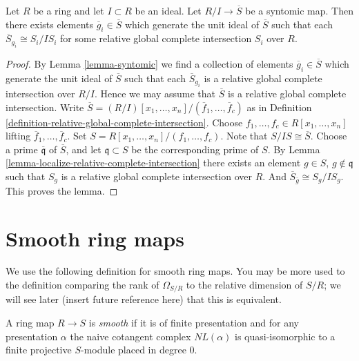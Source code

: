 \begin{lemma}
\label{lemma-lift-syntomic}
Let $R$ be a ring and let $I \subset R$ be an ideal.
Let $R/I \to \overline{S}$ be a syntomic map.
Then there exists elements $\overline{g}_i \in \overline{S}$
which generate the unit ideal of $\overline{S}$
such that each $\overline{S}_{g_i} \cong S_i/IS_i$
for some relative global complete intersection $S_i$
over $R$.
\end{lemma}

\begin{proof}
By Lemma \ref{lemma-syntomic} we find a collection of elements
$\overline{g}_i \in \overline{S}$
which generate the unit ideal of $\overline{S}$
such that each $\overline{S}_{g_i}$ is a relative
global complete intersection over $R/I$.
Hence we may assume that $\overline{S}$ is a
relative global complete intersection.
Write
$\overline{S} =
(R/I)[x_1, \ldots, x_n]/(\overline{f}_1, \ldots, \overline{f}_c)$
as in Definition \ref{definition-relative-global-complete-intersection}.
Choose $f_1, \ldots, f_c \in R[x_1, \ldots, x_n]$
lifting $\overline{f}_1, \ldots, \overline{f}_c$.
Set $S = R[x_1, \ldots, x_n]/(f_1, \ldots, f_c)$.
Note that $S/IS \cong \overline{S}$.
Choose a prime $\overline{\mathfrak q}$ of $\overline{S}$,
and let $\mathfrak q \subset S$ be the corresponding prime of $S$. 
By Lemma \ref{lemma-localize-relative-complete-intersection}
there exists an element $g \in S$, $g \not\in \mathfrak q$
such that $S_g$ is a relative global complete intersection over $R$.
And $\overline{S}_{\overline{g}} \cong S_g/IS_g$. This
proves the lemma.
\end{proof}


\section{Smooth ring maps}
\label{section-smooth}

\noindent
We use the following definition for smooth ring maps.
You may be more used to the definition comparing the
rank of $\Omega_{S/R}$ to the relative dimension of $S/R$;
we will see later (insert future reference here) that this
is equivalent.

\begin{definition}
\label{definition-smooth}
A ring map $R \to S$ is {\it smooth} if it is of finite presentation
and for any presentation $\alpha$ the naive cotangent complex $NL(\alpha)$
is quasi-isomorphic to a finite projective $S$-module placed in degree $0$.
\end{definition}

